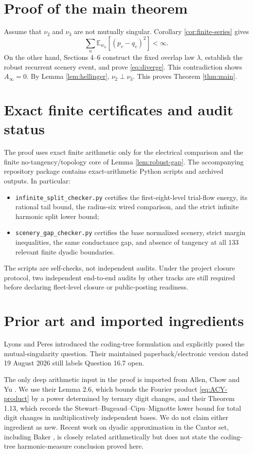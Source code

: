 \documentclass[11pt]{article}
\theoremstyle{remark}
\newcommand{\E}{\mathbb E}
\begin{document}
\section{Proof of the main theorem}

Assume that $\nu_2$ and $\nu_3$ are not mutually singular.  Corollary \ref{cor:finite-series} gives
\[
 \sum_n\E_{w_n}[(p_v-q_v)^2]<\infty.
\]
On the other hand, Sections 4--6 construct the fixed overlap law $\lambda$, establish the robust recurrent scenery event, and prove \eqref{eq:diverge}.  This contradiction shows $A_\infty=0$.  By Lemma \ref{lem:hellinger}, $\nu_2\perp\nu_3$.  This proves Theorem \ref{thm:main}.

\section{Exact finite certificates and audit status}

The proof uses exact finite arithmetic only for the electrical comparison and the finite no-tangency/topology core of Lemma \ref{lem:robust-gap}.  The accompanying repository package contains exact-arithmetic Python scripts and archived outputs.  In particular:
\begin{itemize}
\item \texttt{infinite\_split\_checker.py} certifies the first-eight-level trial-flow energy, its rational tail bound, the radius-six wired comparison, and the strict infinite harmonic split lower bound;
\item \texttt{scenery\_gap\_checker.py} certifies the base normalized scenery, strict margin inequalities, the same conductance gap, and absence of tangency at all 133 relevant finite dyadic boundaries.
\end{itemize}
The scripts are self-checks, not independent audits.  Under the project closure protocol, two independent end-to-end audits by other tracks are still required before declaring fleet-level closure or public-posting readiness.

\section{Prior art and imported ingredients}

Lyons and Peres \cite{LP} introduced the coding-tree formulation and explicitly posed the mutual-singularity question.  Their maintained paperback/electronic version dated 19 August 2026 still labels Question 16.7 open.

The only deep arithmetic input in the proof is imported from Allen, Chow and Yu \cite{ACY}.  We use their Lemma 2.6, which bounds the Fourier product \eqref{eq:ACY-product} by a power determined by ternary digit changes, and their Theorem 1.13, which records the Stewart--Bugeaud--Cipu--Mignotte lower bound for total digit changes in multiplicatively independent bases.  We do not claim either ingredient as new.  Recent work on dyadic approximation in the Cantor set, including Baker \cite{Baker}, is closely related arithmetically but does not state the coding-tree harmonic-measure conclusion proved here.
\end{document}
